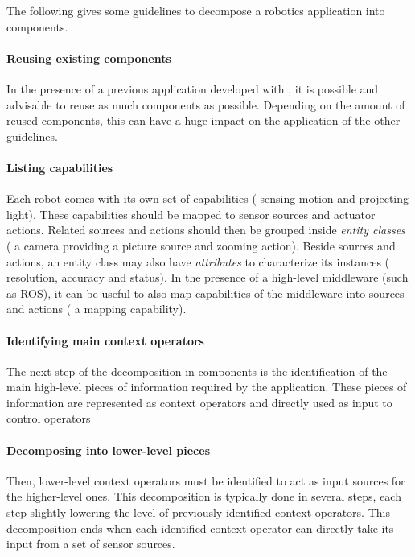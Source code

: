 The following gives some guidelines to decompose a robotics
application into components.

\paragraph*{Reusing existing components}
In the presence of a previous application developed with \diaspec{},
it is possible and advisable to reuse as much components as possible.
Depending on the amount of reused components, this can have a huge
impact on the application of the other guidelines.

\paragraph*{Listing capabilities}
Each robot comes with its own set of capabilities (\eg{} sensing
motion and projecting light). These capabilities should be mapped to
sensor sources and actuator actions. Related sources and actions
should then be grouped inside \emph{entity classes} (\eg{} a camera
providing a picture source and zooming action). Beside sources and
actions, an entity class may also have \emph{attributes} to
characterize its instances (\eg{} resolution, accuracy and status). In
the presence of a high-level middleware (such as ROS), it can be
useful to also map capabilities of the middleware into sources and
actions (\eg{} a mapping capability).

\paragraph*{Identifying main context operators}
The next step of the decomposition in components is the identification
of the main high-level pieces of information required by the
application. These pieces of information are represented as context
operators and directly used as input to control operators

\paragraph*{Decomposing into lower-level pieces}
Then, lower-level context operators must be identified to act as input
sources for the higher-level ones. This decomposition is typically
done in several steps, each step slightly lowering the level of
previously identified context operators. This decomposition ends when
each identified context operator can directly take its input from a
set of sensor sources. 

